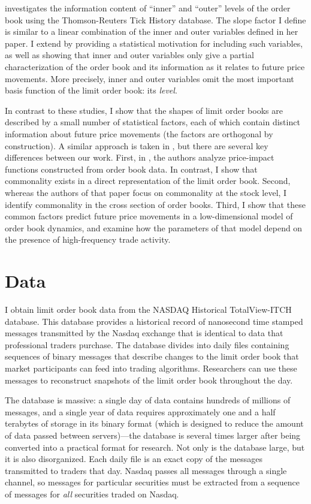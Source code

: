 \citet{Yuferova2015} investigates the information content of ``inner'' and ``outer'' levels of the order book using the Thomson-Reuters Tick History database. The slope factor I define is similar to a linear combination of the inner and outer variables defined in her paper. I extend \citet{Yuferova2015} by providing a statistical motivation for including such variables, as well as showing that inner and outer variables only give a partial characterization of the order book and its information as it relates to future price movements. More precisely, inner and outer variables omit the most important basis function of the limit order book: its \textit{level}.

In contrast to these studies, I show that the shapes of limit order books are described by a small number of statistical factors, each of which contain distinct information about future price movements (the factors are orthogonal by construction). A similar approach is taken in \citet{Beltran-Lopez2009}, but there are several key differences between our work. First, in \citet{Beltran-Lopez2009}, the authors analyze price-impact functions constructed from order book data. In contrast, I show that commonality exists in a direct representation of the limit order book. Second, whereas the authors of that paper focus on commonality at the stock level, I identify commonality in the cross section of order books. Third, I show that these common factors predict future price movements in a low-dimensional model of order book dynamics, and examine how the parameters of that model depend on the presence of high-frequency trade activity.



\section{Data}
\label{sec:data}

I obtain limit order book data from the NASDAQ Historical TotalView-ITCH database. This database provides a historical record of nanosecond time stamped messages transmitted by the Nasdaq exchange that is identical to data that professional traders purchase. The database divides into daily files containing sequences of binary messages that describe changes to the limit order book that market participants can feed into trading algorithms. Researchers can use these messages to reconstruct snapshots of the limit order book throughout the day.

The database is massive: a single day of data contains hundreds of millions of messages, and a single year of data requires approximately one and a half terabytes of storage in its binary format (which is designed to reduce the amount of data passed between servers)---the database is several times larger after being converted into a practical format for research. Not only is the database large, but it is also disorganized. Each daily file is an exact copy of the messages transmitted to traders that day. Nasdaq passes all messages through a single channel, so messages for particular securities must be extracted from a sequence of messages for \textit{all} securities traded on Nasdaq.

